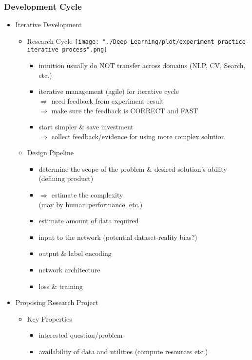 \subsubsection{Development Cycle}
\begin{itemize}
\item Iterative Development
	\begin{itemize}
	\item Research Cycle
		\texttt{[image: "./Deep Learning/plot/experiment practice-iterative process".png]}
		\begin{itemize}
		\item intuition usually do NOT transfer across domains (NLP, CV, Search, etc.)
		\item iterative management (agile) for iterative cycle \\
		$\Rightarrow$ need feedback from experiment result \\
		$\Rightarrow$ make sure the feedback is CORRECT and FAST
		\item start simpler \& save investment \\
		$\Rightarrow$ collect feedback/evidence for using more complex solution
		\end{itemize}
	\item Design Pipeline
		\begin{itemize}
		\item determine the scope of the problem \& desired solution's ability \\
		(defining product)
		\item $\Rightarrow$ estimate the complexity \\
		(may by human performance, etc.)
		\item estimate amount of data required
		\item input to the network (potential dataset-reality bias?)
		\item output \& label encoding
		\item network architecture
		\item loss \& training
		\end{itemize}
	\end{itemize}
\item Proposing Research Project
	\begin{itemize}
	\item Key Properties
		\begin{itemize}
		\item interested question/problem
		\item availability of data and utilities (compute resources etc.)

\end{itemize}
\end{itemize}
\end{itemize}

